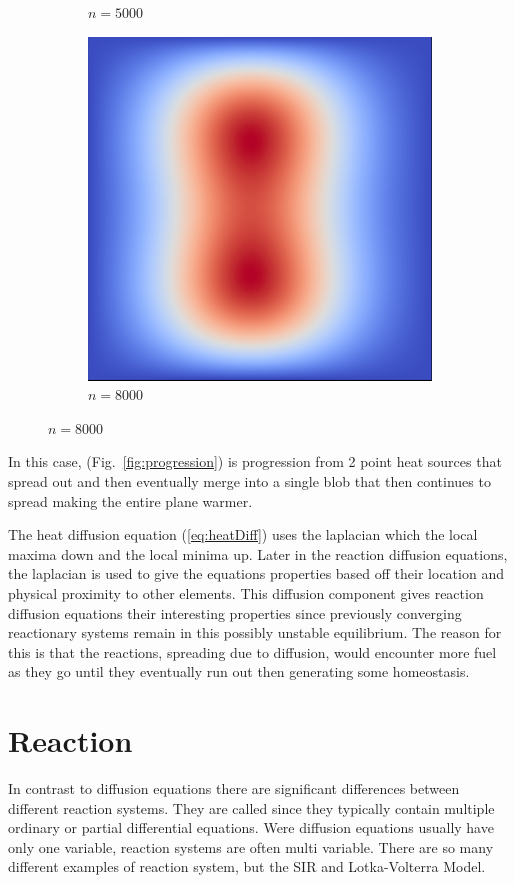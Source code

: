 \documentclass[12pt, letterpaper]{article}
\begin{document}
\begin{figure}[h]
\begin{subfigure}[b]{.21\linewidth}
    \caption{$n=5000$}
  \end{subfigure}
  \begin{subfigure}[b]{.21\linewidth}
    \includegraphics[width=\linewidth]{HeatProgression/diffusion8000}
    \caption{$n=8000$}
  \end{subfigure}
\end{figure}

In this case, (Fig.~\ref{fig:progression}) is progression from 2 point heat sources that spread out
and then eventually merge into a single blob that then continues to spread making the entire plane warmer.

The heat diffusion equation (\ref{eq:heatDiff}) uses the laplacian which  the local maxima down 
and the local minima up. Later in the reaction diffusion equations, the laplacian is used to give the
equations properties based off their location and physical proximity to other elements. This diffusion
component gives reaction diffusion equations their interesting properties since previously converging
reactionary systems remain in this possibly unstable equilibrium. The reason for this is that the reactions,
spreading due to diffusion, would encounter more fuel as they go until they eventually run out then generating
some homeostasis.

\section{Reaction}
In contrast to diffusion equations there are significant differences between different reaction systems.
They are called  since they typically contain multiple ordinary or partial 
differential equations. Were diffusion equations usually have only one variable, reaction systems are often
multi variable. There are so many different examples of reaction system, but the SIR and Lotka-Volterra Model.
\end{document}
